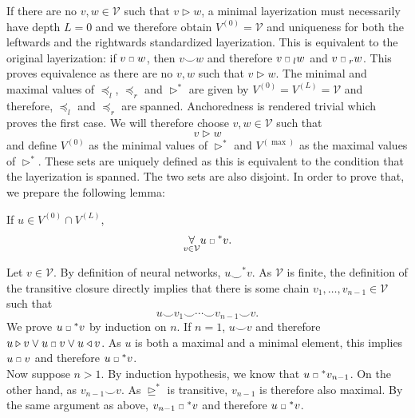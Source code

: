 \documentclass[a4paper,11pt]{report}
\newcommand{\conn}{\smile} %
\newcommand{\smallsquare}{\;\scalebox{0.6}{$\square$}\;}
\begin{document}
\begin{Bew}
If there are no $v,w\in\mathcal{V}$ such that $v\triangleright w$, a minimal layerization must necessarily have depth $L=0$ and we therefore obtain $V^{(0)}=\mathcal{V}$ and uniqueness for both the leftwards and the rightwards standardized layerization. This is equivalent to the original layerization: if $v\smallsquare w$, then $v\conn w$ and therefore $v\smallsquare_lw$ and $v\smallsquare_rw$. This proves equivalence as there are no $v,w$ such that $v\triangleright w$. The minimal and maximal values of $\preceq_l$, $\preceq_r$ and $\triangleright^*$ are given by $V^{(0)}=V^{(L)}=\mathcal{V}$ and therefore, $\preceq_l$ and $\preceq_r$ are spanned. Anchoredness is rendered trivial which proves the first case. We will therefore choose $v,w\in\mathcal{V}$ such that
\begin{equation}\label{eq:standardized-layerization-1}
v\triangleright w
\end{equation}
and define $V^{(0)}$ as the minimal values of $\triangleright^*$ and $V^{(\max)}$ as the maximal values of $\triangleright^*$. These sets are uniquely defined as this is equivalent to the condition that the layerization is spanned. The two sets are also disjoint. In order to prove that, we prepare the following lemma:

\begin{BLem}\label{standardized-layerization-2}
If $u\in V^{(0)}\cap V^{(L)}$,
\[
\underset{v\in\mathcal{V}}{\forall}u\smallsquare^* v.
\]
\end{BLem}

\begin{BBew}
Let $v\in\mathcal{V}$. By definition of neural networks, $u\conn^*v$. As $\mathcal{V}$ is finite, the definition of the transitive closure directly implies that there is some chain $v_1,\dotsc,v_{n-1}\in\mathcal{V}$ such that
\[
u\conn v_1\conn\dotsb\conn v_{n-1}\conn v.
\]
We prove $u\smallsquare^*v$ by induction on $n$.
If $n=1$, $u\conn v$ and therefore $u\triangleright v\vee u\smallsquare v\vee u\triangleleft v$. As $u$ is both a maximal and a minimal element, this implies $u\smallsquare v$ and therefore $u\smallsquare^* v$.\\
Now suppose $n>1$. By induction hypothesis, we know that $u\smallsquare^* v_{n-1}$. On the other hand, as $v_{n-1}\conn v$. As $\trianglerighteq^*$ is transitive, $v_{n-1}$ is therefore also maximal. By the same argument as above, $v_{n-1}\smallsquare^* v$ and therefore $u\smallsquare^* v$.
\end{BBew}


\end{Bew}
\end{document}
